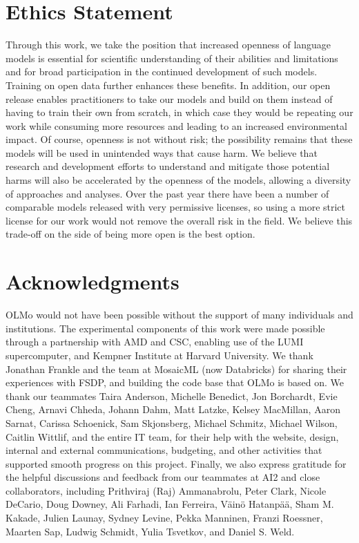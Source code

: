 \documentclass[11pt]{article}
\newcommand{\olmo}{OLMo\xspace}
\begin{document}
\section*{Ethics Statement}
Through this work, we take the position that increased openness of language models is essential for scientific understanding of their abilities and limitations and for broad participation in the continued development of such models.  
Training on open data further enhances these benefits. In addition, our open release enables practitioners to take our models and build on them instead of having to train their own from scratch, in which case they would be repeating our work while consuming more resources and leading to an increased environmental impact. 
Of course, openness is not without risk; the possibility remains that these models will be used in unintended ways that cause harm.  
We believe that research and development efforts to understand and mitigate those potential harms will also be accelerated by the openness of the models, allowing a diversity of approaches and analyses. 
Over the past year there have been a number of comparable models released with very permissive licenses, so using a more strict license for our work would not remove the overall risk in the field. 
We believe this trade-off on the side of being more open is the best option.

\section*{Acknowledgments}
 \label{sec:ack}
 \olmo would not have been possible without the support of many individuals and institutions.
 The experimental components of this work were made possible through a partnership with AMD and CSC, enabling use of the LUMI supercomputer, and Kempner Institute at Harvard University.
 We thank Jonathan Frankle and the team at MosaicML (now Databricks) for sharing their experiences with FSDP, and building the code base that OLMo is based on.
 We thank our teammates Taira Anderson, Michelle Benedict, Jon Borchardt, Evie Cheng, Arnavi Chheda, Johann Dahm, Matt Latzke, Kelsey MacMillan, Aaron Sarnat, Carissa Schoenick, Sam Skjonsberg, Michael Schmitz, Michael Wilson, Caitlin Wittlif, and the entire IT team, for their help with the website, design, internal and external communications, budgeting, and other activities that supported smooth progress on this project.
 Finally, we also express gratitude for the helpful discussions and feedback from our teammates at AI2 and close collaborators, including Prithviraj (Raj) Ammanabrolu, Peter Clark, Nicole DeCario, Doug Downey, Ali Farhadi, Ian Ferreira, Väinö Hatanpää, Sham M. Kakade, Julien Launay, Sydney Levine, Pekka Manninen, Franzi Roessner, Maarten Sap, Ludwig Schmidt, Yulia Tsvetkov, and Daniel S. Weld.
\end{document}
